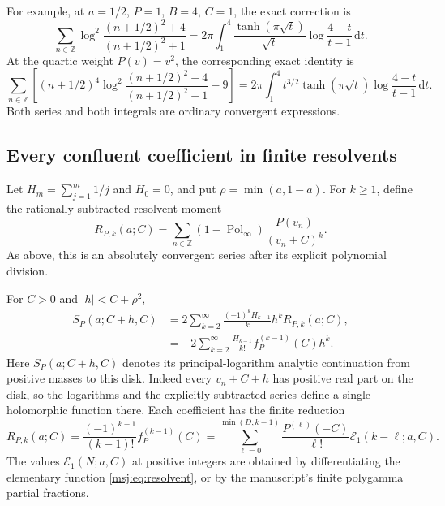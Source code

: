 For example, at $a=1/2$, $P=1$, $B=4$, $C=1$, the exact correction is
\begin{equation}
 \sum_{n\in\mathbb Z}
 \log^2\frac{(n+1/2)^2+4}{(n+1/2)^2+1}
 =2\pi\int_1^4\frac{\tanh(\pi\sqrt t)}{\sqrt t}
                      \log\frac{4-t}{t-1}\,\mathrm dt.
 \label{msj:eq:example-unweighted}
\end{equation}
At the quartic weight $P(v)=v^2$, the corresponding exact identity is
\begin{equation}
 \sum_{n\in\mathbb Z}\left[
 (n+1/2)^4\log^2\frac{(n+1/2)^2+4}{(n+1/2)^2+1}-9\right]
 =2\pi\int_1^4 t^{3/2}\tanh(\pi\sqrt t)
                       \log\frac{4-t}{t-1}\,\mathrm dt.
 \label{msj:eq:example-weighted}
\end{equation}
Both series and both integrals are ordinary convergent expressions.

\subsection{Every confluent coefficient in finite resolvents}

Let $H_m=\sum_{j=1}^m1/j$ and $H_0=0$, and put
$\rho=\min(a,1-a)$. For $k\ge1$, define the rationally subtracted
resolvent moment
\begin{equation}
 R_{P,k}(a;C)
 =\sum_{n\in\mathbb Z}(1-\operatorname{Pol}_{\infty})
                         \frac{P(v_n)}{(v_n+C)^k}.
 \label{msj:eq:Rpk}
\end{equation}
As above, this is an absolutely convergent series after its explicit
polynomial division.

\begin{theorem}
\label{msj:thm:confluent}
For $C>0$ and $|h|<C+\rho^2$,
\begin{align}
 S_P(a;C+h,C)
 &=2\sum_{k=2}^{\infty}\frac{(-1)^kH_{k-1}}{k}
                       h^k R_{P,k}(a;C),
 \label{msj:eq:confluent-resolvent}\\
 &=-2\sum_{k=2}^{\infty}\frac{H_{k-1}}{k!}
                       f_P^{(k-1)}(C)h^k.
 \label{msj:eq:confluent-elementary}
\end{align}
Here $S_P(a;C+h,C)$ denotes its principal-logarithm analytic
continuation from positive masses to this disk.  Indeed every
$v_n+C+h$ has positive real part on the disk, so the logarithms
and the explicitly subtracted series define a single holomorphic
function there.
Each coefficient has the finite reduction
\begin{equation}
 R_{P,k}(a;C)
 =\frac{(-1)^{k-1}}{(k-1)!}f_P^{(k-1)}(C)
 =\sum_{\ell=0}^{\min(D,k-1)}
       \frac{P^{(\ell)}(-C)}{\ell!}
                          \mathcal E_1(k-\ell;a,C).
 \label{msj:eq:Rpk-finite}
\end{equation}
The values $\mathcal E_1(N;a,C)$ at positive integers are obtained by
differentiating the elementary function \eqref{msj:eq:resolvent}, or
by the manuscript's finite polygamma partial fractions.
\end{theorem}


